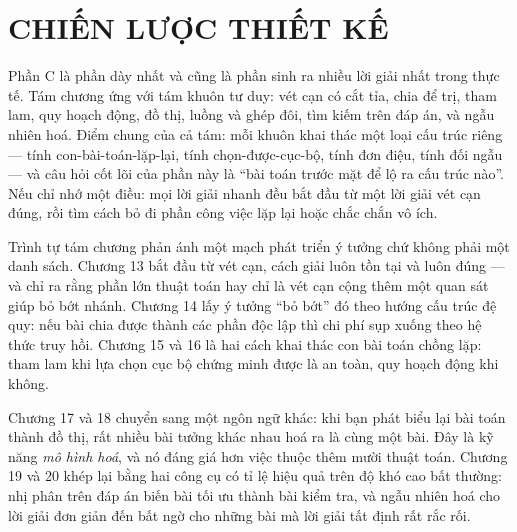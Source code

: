\documentclass[../algorithm.tex]{subfiles}
\begin{document}
\part{CHIẾN LƯỢC THIẾT KẾ}
\begin{tomtat}
Phần C là phần dày nhất và cũng là phần sinh ra nhiều lời giải nhất trong thực tế. Tám chương ứng với tám khuôn tư duy: vét cạn có cắt tỉa, chia để trị, tham lam, quy hoạch động, đồ thị, luồng và ghép đôi, tìm kiếm trên đáp án, và ngẫu nhiên hoá. Điểm chung của cả tám: mỗi khuôn khai thác một loại cấu trúc riêng --- tính con-bài-toán-lặp-lại, tính chọn-được-cục-bộ, tính đơn điệu, tính đối ngẫu --- và câu hỏi cốt lõi của phần này là ``bài toán trước mặt để lộ ra cấu trúc nào''. Nếu chỉ nhớ một điều: mọi lời giải nhanh đều bắt đầu từ một lời giải vét cạn đúng, rồi tìm cách bỏ đi phần công việc lặp lại hoặc chắc chắn vô ích.
\end{tomtat}

Trình tự tám chương phản ánh một mạch phát triển ý tưởng chứ không phải một danh sách. Chương 13 bắt đầu từ vét cạn, cách giải luôn tồn tại và luôn đúng --- và chỉ ra rằng phần lớn thuật toán hay chỉ là vét cạn cộng thêm một quan sát giúp bỏ bớt nhánh. Chương 14 lấy ý tưởng ``bỏ bớt'' đó theo hướng cấu trúc đệ quy: nếu bài chia được thành các phần độc lập thì chi phí sụp xuống theo hệ thức truy hồi. Chương 15 và 16 là hai cách khai thác con bài toán chồng lặp: tham lam khi lựa chọn cục bộ chứng minh được là an toàn, quy hoạch động khi không.

Chương 17 và 18 chuyển sang một ngôn ngữ khác: khi bạn phát biểu lại bài toán thành đồ thị, rất nhiều bài tưởng khác nhau hoá ra là cùng một bài. Đây là kỹ năng \emph{mô hình hoá}, và nó đáng giá hơn việc thuộc thêm mười thuật toán. Chương 19 và 20 khép lại bằng hai công cụ có tỉ lệ hiệu quả trên độ khó cao bất thường: nhị phân trên đáp án biến bài tối ưu thành bài kiểm tra, và ngẫu nhiên hoá cho lời giải đơn giản đến bất ngờ cho những bài mà lời giải tất định rất rắc rối.









\ifSubfilesClassLoaded{\printbibliography[title={Nguồn}]}{}
\end{document}
